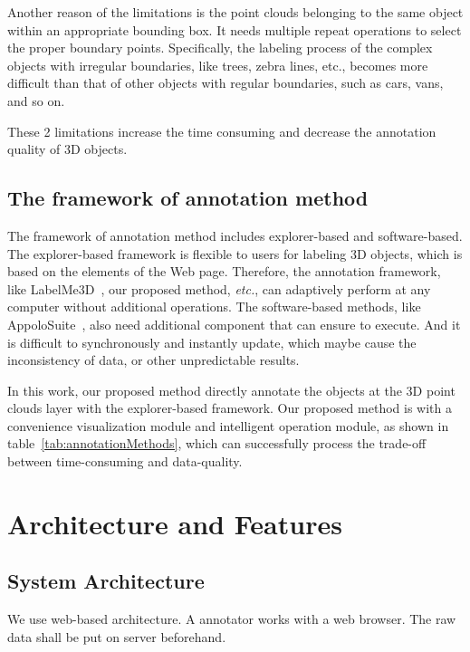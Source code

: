 \documentclass[letterpaper, 10 pt, conference]{ieeeconf}  %
\begin{document}
Another reason of the limitations is the point clouds belonging to the same object within an appropriate bounding box.
It needs multiple repeat operations to select the proper boundary points.
Specifically, the labeling process of the complex objects with irregular boundaries, like trees, zebra lines, etc., becomes more difficult than that of other objects with regular boundaries, such as cars, vans, and so on.

These 2 limitations increase the time consuming and decrease the annotation quality of 3D objects.
\subsection{The framework of annotation method}
The framework of annotation method includes explorer-based and software-based. The explorer-based framework is flexible to users for labeling 3D objects, which is based on the elements of the Web page. Therefore, the annotation framework, like LabelMe3D~\cite{LabelMe3D}, our proposed method, \emph{etc.}, can adaptively perform at any computer without additional operations. The software-based methods, like AppoloSuite~\cite{SUPERVISELY,wang2019apolloscape}, also need additional component that can ensure to execute. And it is difficult to synchronously and instantly update, which maybe cause the inconsistency of data, or other unpredictable results.

In this work, our proposed method directly annotate the objects at the 3D point clouds layer with the explorer-based framework. Our proposed method is with a convenience visualization module and intelligent operation module, as shown in table~\ref{tab:annotationMethods}, which can successfully process the trade-off between time-consuming and data-quality.

\section{Architecture and Features}

\subsection{System Architecture}
We use web-based architecture. A annotator works with a web browser. The raw data shall be put on server beforehand. 
\end{document}
